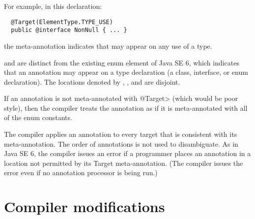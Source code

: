 \documentclass[10pt]{article}
\begin{document}
For example, in this declaration:

\begin{Verbatim}
  @Target(ElementType.TYPE_USE)
  public @interface NonNull { ... }
\end{Verbatim}

\noindent
the  meta-annotation indicates that
 may appear on any use of a type.

 and  are
distinct from the existing  enum element
of Java SE 6, which indicates that an annotation may appear on a type
declaration (a class, interface, or enum declaration).  The locations
denoted by ,
, and  are disjoint.

If an annotation is not meta-annotated with \<@Target> (which would be poor
style), then the compiler treats the annotation as if it is
meta-annotated with all of the  enum constants.

The compiler applies an annotation to every target that is consistent with
its meta-annotation.  The order of annotations is not used to disambiguate.
As in Java SE 6, the compiler issues an error if a programmer places an
annotation in a location not permitted by its Target meta-annotation.  (The
compiler issues the error even if no annotation processor is being run.)



\section{Compiler modifications\label{mods}\label{compiler}}

% 
% 
\end{document}
